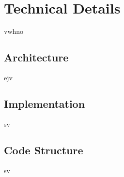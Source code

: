\chapter{Technical Details}
\label{Tools}
vwhno

\section{Architecture}
ejv
\section{Implementation}
sv
\section{Code Structure}
sv